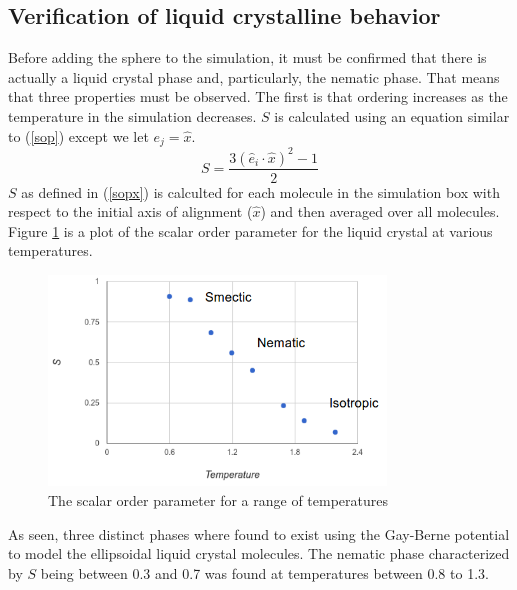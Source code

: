 \documentclass[preprint, aps]{revtex4-1}
\begin{document}
\subsection*{Verification of liquid crystalline behavior}
Before adding the sphere to the simulation, it must be confirmed that there is
actually a liquid crystal phase and, particularly, the nematic phase. That means
that three properties must be observed. The first is that ordering increases as
the temperature in the simulation decreases. $S$ is calculated using an
equation similar to (\ref{sop}) except we let $e_j=\hat{x}$.
	\begin{equation}\label{sopx}
		S = \frac{3(\hat{e}_i \cdot \hat{x})^2-1}{2}
	\end{equation}
$S$ as defined in (\ref{sopx}) is calculted for each molecule in the
simulation box with respect to the initial axis of alignment ($\hat{x}$) and
then averaged over all molecules. Figure \ref{fig:phase} is a plot of the
scalar order parameter for the liquid crystal at various temperatures.
	\begin{figure}[H]
		\centering
		\includegraphics[width=0.8\textwidth]{phase.png}
		\caption{The scalar order parameter for a range of temperatures}
		\label{fig:phase}
	\end{figure}
As seen, three distinct phases where found to exist using the Gay-Berne 
potential to model the ellipsoidal liquid crystal molecules. The nematic phase
characterized by $S$ being between 0.3 and 0.7 was found at temperatures between
0.8 to 1.3.
\end{document}
